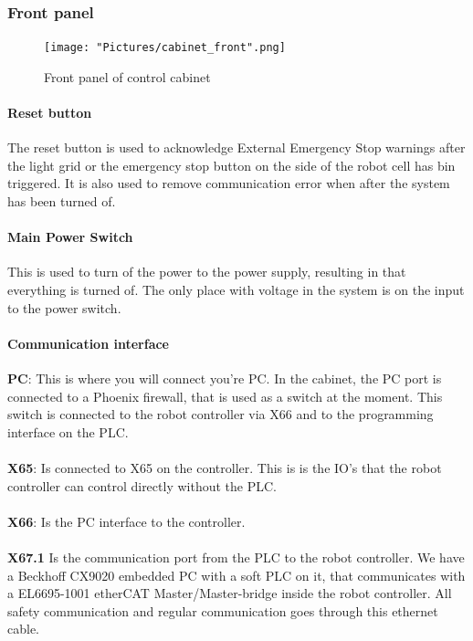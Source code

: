 \documentclass{article}
\begin{document}
        \subsubsection{Front panel}
        \begin{figure}[!h]
            \centering
            \texttt{[image: "Pictures/cabinet\_front".png]}
            \caption{Front panel of control cabinet}
        \end{figure}
        
        \paragraph{Reset button}
        The reset button is used to acknowledge External Emergency Stop warnings after the light grid or the emergency stop button on the side of the robot cell has bin triggered. It is also used to remove communication error when after the system has been turned of. 
        
        \paragraph{Main Power Switch}
        This is used to turn of the power to the power supply, resulting in that everything is turned of. The only place with voltage in the system is on the input to the power switch.
        
        \paragraph{Communication interface}
        \textbf{PC}: This is where you will connect you're PC. In the cabinet, the PC port is connected to a Phoenix firewall, that is used as a switch at the moment. This switch is connected to the robot controller via X66 and to the programming interface on the PLC.
        \\\\
        \textbf{X65}: Is connected to X65 on the controller. This is is the IO's that the robot controller can control directly without the PLC.
        \\\\
        \textbf{X66}: Is the PC interface to the controller.
        \\\\
        \textbf{X67.1} Is the communication port from the PLC to the robot controller. We have a Beckhoff CX9020 embedded PC with a soft PLC on it, that communicates with a EL6695-1001 etherCAT Master/Master-bridge inside the robot controller. All safety communication and regular communication goes through this ethernet cable.  
        
\end{document}
